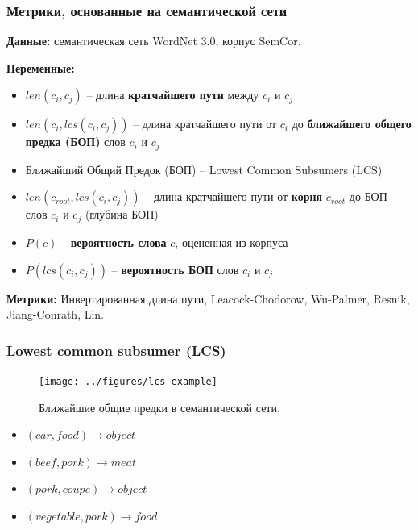 \begin{frame}
\frametitle{Метрики, основанные на семантической сети}

 \textbf{Данные:} семантическая сеть WordNet 3.0, корпус SemCor.
    
 \textbf{Переменные:}
\begin{itemize}
\item $len(c_i,c_j)$ -- длина \textbf{кратчайшего пути} между $c_i$ и $c_j$
\item  $len(c_i, lcs(c_i,c_j))$ -- длина кратчайшего пути от $c_i$ до \textbf{ближайшего общего предка  (БОП)} слов $c_i$ и $c_j$

\item Ближайший Общий Предок (БОП) -- Lowest Common Subsumers (LCS) 

\item $len(c_{root}, lcs(c_i,c_j))$ -- длина кратчайшего пути от \textbf{корня} $c_{root}$ до БОП слов $c_i$ и $c_j$ (глубина БОП)
\item $P(c)$ --  \textbf{вероятность слова} $c$, оцененная из корпуса
\item  $P(lcs(c_i, c_j))$ -- \textbf{вероятность БОП} слов $c_i$ и $c_j$
\end{itemize}
    
    
\textbf{Метрики:} Инвертированная длина пути, Leacock-Chodorow, Wu-Palmer, 
 Resnik, Jiang-Conrath, Lin.
  
\end{frame}




\begin{frame}
\frametitle{Lowest common subsumer (LCS) }

\begin{figure}
\centering
\texttt{[image: ../figures/lcs-example]}
\caption{Ближайшие общие предки в семантической сети.}
\end{figure}
    
\begin{itemize}
  \item $(car, food) \rightarrow object$
  \item $(beef, pork) \rightarrow meat$
  \item $(pork, coupe) \rightarrow object$
  \item $(vegetable, pork) \rightarrow food$
\end{itemize}

\end{frame}







